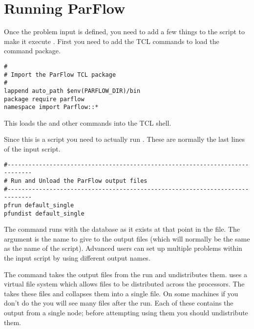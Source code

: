 
\section{Running ParFlow}
\label{Running ParFlow}

Once the problem input is defined, you need to add a few things to 
the script to make it execute \parflow{}.  First you need to add
the TCL commands to load the \parflow{} command package.

\begin{display}\begin{verbatim}
#
# Import the ParFlow TCL package
#
lappend auto_path $env(PARFLOW_DIR)/bin 
package require parflow
namespace import Parflow::*
\end{verbatim}\end{display}

This loads the  and other \parflow{} commands into the
TCL shell.

Since this is a script you need to actually run \parflow{}. These are
normally the last lines of the input script.

\begin{display}\begin{verbatim}
#-----------------------------------------------------------------------------
# Run and Unload the ParFlow output files
#-----------------------------------------------------------------------------
pfrun default_single
pfundist default_single
\end{verbatim}\end{display}


The  command runs \parflow{} with the database as it
exists at that point in the file.  The argument is the name to give to
the output files (which will normally be the same as the name of the
script).  Advanced users can set up multiple problems within the input
script by using different output names.  

The  command takes the output files from the \parflow{}
run and undistributes them.  \parflow{} uses a virtual file system
which allows files to be distributed across the processors.  The
 takes these files and collapses them into a single
file.  On some machines if you don't do the  you will
see many files after the run.  Each of these contains the output from
a single node; before attempting using them you should undistribute them.

